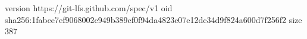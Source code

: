 version https://git-lfs.github.com/spec/v1
oid sha256:1fabee7ef9068002c949b389cf0f94da4823c07e12dc34d9f824a600d7f256f2
size 387

